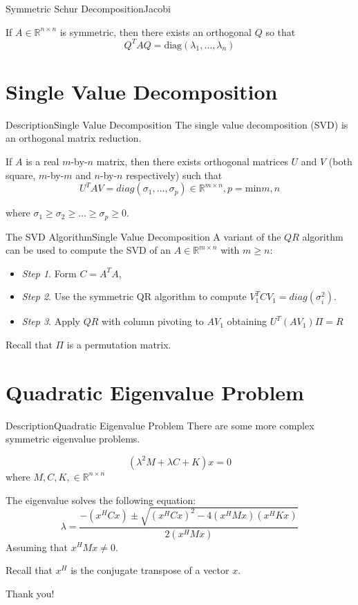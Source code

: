 \documentclass{beamer}
\begin{document}
\begin{frame}{Symmetric Schur Decomposition}{Jacobi}
\begin{definition}
If $A \in \mathbb{R}^{n \times n}$ is symmetric, then there exists an orthogonal $Q$ so that
\[Q^T A Q = \text{diag}(\lambda_1, \dots, \lambda_n)\]
\end{definition}
\end{frame}

\section[SVD]{Single Value Decomposition}
\begin{frame}{Description}{Single Value Decomposition}
The single value decomposition (SVD) is an orthogonal matrix reduction.

If $A$ is a real $m$-by-$n$ matrix, then there exists orthogonal matrices $U$ and $V$ (both square, $m$-by-$m$ and $n$-by-$n$ respectively) such that
\[U^T A V = diag(\sigma_1 , \dots , \sigma_p) \in \mathbb{R}^{m \times n}, p = \text{min}{m,n}\]

where $\sigma_1 \geq \sigma_2 \geq \dots \geq \sigma_p \geq 0$.
\end{frame}

\begin{frame}{The SVD Algorithm}{Single Value Decomposition}
A variant of the $QR$ algorithm can be used to compute the SVD of an $A \in \mathbb{R}^{m \times n}$ with $m \geq n$:

\begin{itemize}
  \item \textit{Step 1}. Form $C = A^T A$,
  \item \textit{Step 2}. Use the symmetric QR algorithm to compute $V_1^T C V_1 = diag(\sigma_i^2)$.
  \item \textit{Step 3}. Apply $QR$ with column pivoting to $AV_1$ obtaining $U^T(AV_1)\Pi = R$
\end{itemize}
\pause
Recall that $\Pi$ is a permutation matrix.
\end{frame}

\section{Quadratic Eigenvalue Problem}

\begin{frame}{Description}{Quadratic Eigenvalue Problem}
There are some more complex symmetric eigenvalue problems.

\begin{example}
\[(\lambda^2 M + \lambda C + K) x = 0\]
where $M, C, K, \in \mathbb{R}^{n \times n}$
\end{example}
\pause
The eigenvalue solves the following equation:
\[\lambda = \dfrac{-(x^H C x) \pm \sqrt{(x^H C x)^2 -4(x^H Mx)(x^H Kx)}}{2(x^H Mx)}\]
Assuming that $x^H M x \not = 0$.
\pause

Recall that $x^H$ is the conjugate transpose of a vector $x$.
\end{frame}

\begin{frame}
\vspace{4ex}
{\Huge Thank you!}

\end{frame}
\end{document}
